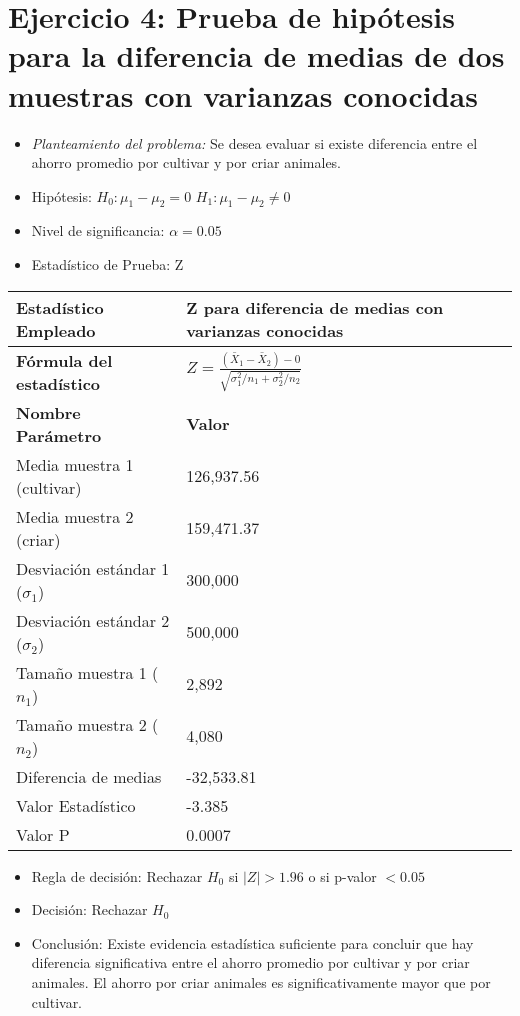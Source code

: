 \documentclass[12pt,a4paper]{article}
\begin{document}
\section*{Ejercicio 4: Prueba de hipótesis para la diferencia de medias de dos muestras con varianzas conocidas}
\begin{itemize}
    \item \textit{Planteamiento del problema:} Se desea evaluar si existe diferencia entre el ahorro promedio por cultivar y por criar animales.
    \item Hipótesis: \quad $H_{0}: \mu_1 - \mu_2 = 0$ \hspace{2cm} $H_{1}: \mu_1 - \mu_2 \neq 0$
    \item Nivel de significancia: $\alpha = 0.05$
    \item Estadístico de Prueba: Z
\end{itemize}

\begin{tabular}{|m{7cm}|m{7cm}|}
\hline
\textbf{Estadístico Empleado} & Z para diferencia de medias con varianzas conocidas \\ \hline
\textbf{Fórmula del estadístico} & $Z = \frac{(\bar{X}_1 - \bar{X}_2) - 0}{\sqrt{\sigma_1^2/n_1 + \sigma_2^2/n_2}}$ \\ \hline
\textbf{Nombre Parámetro} & \textbf{Valor} \\ \hline
Media muestra 1 (cultivar) & 126,937.56 \\ \hline
Media muestra 2 (criar) & 159,471.37 \\ \hline
Desviación estándar 1 ($\sigma_1$) & 300,000 \\ \hline
Desviación estándar 2 ($\sigma_2$) & 500,000 \\ \hline
Tamaño muestra 1 ($n_1$) & 2,892 \\ \hline
Tamaño muestra 2 ($n_2$) & 4,080 \\ \hline
Diferencia de medias & -32,533.81 \\ \hline
Valor Estadístico & -3.385 \\ \hline
Valor P & 0.0007 \\ \hline
\end{tabular}

\begin{itemize}
    \item Regla de decisión: Rechazar $H_0$ si $|Z| > 1.96$ o si p-valor $< 0.05$
    \item Decisión: Rechazar $H_0$
    \item Conclusión: Existe evidencia estadística suficiente para concluir que hay diferencia significativa entre el ahorro promedio por cultivar y por criar animales. El ahorro por criar animales es significativamente mayor que por cultivar.
\end{itemize}
\end{document}
